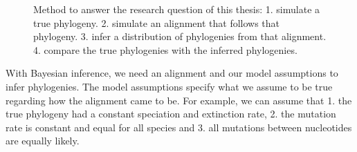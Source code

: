 \begin{figure}[H]
{
  }
  \caption{
    Method to answer the research question of this thesis:
    1. simulate a true phylogeny. 
    2. simulate an alignment that follows that phylogeny. 
    3. infer a distribution of phylogenies from that alignment.
    4. compare the true phylogenies with the inferred phylogenies.
  }
  \label{fig:research_workflow}
\end{figure}

With Bayesian inference, we need an alignment and our model assumptions to
infer phylogenies.
The model assumptions specify what we assume to be true regarding how
the alignment came to be. For example, we can assume that 1. the true
phylogeny had a constant speciation and extinction rate, 2. the
mutation rate is constant and equal for all species and 3. all
mutations between nucleotides are equally likely. 

